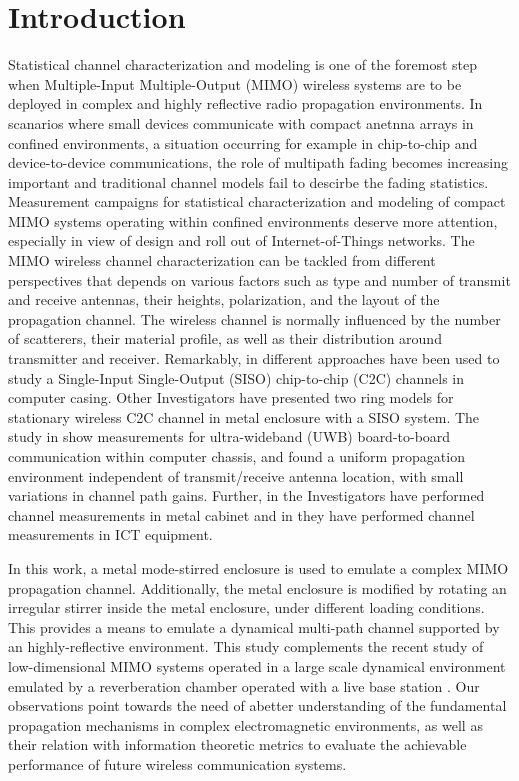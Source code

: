 \documentclass[10pt, final, journal, letterpaper, oneside, twocolumn]{IEEEtran}
\begin{document}
\section{Introduction}\label{sec:introduction}
Statistical channel characterization and modeling is one of the foremost step when Multiple-Input Multiple-Output (MIMO) wireless systems are to be deployed in complex and highly reflective radio propagation environments. In scanarios where small devices communicate with compact anetnna arrays in confined environments, a situation occurring for example in chip-to-chip and device-to-device communications, the role of multipath fading becomes increasing important and traditional channel models fail to descirbe the fading statistics. Measurement campaigns for statistical characterization and modeling of compact MIMO systems operating within confined environments deserve more attention, especially in view of design and roll out of Internet-of-Things networks. The MIMO wireless channel characterization can be tackled from different perspectives that depends on various factors such as type and number of transmit and receive antennas, their heights, polarization, and the layout of the propagation channel. The wireless channel is normally influenced by the number of scatterers, their material profile, as well as their distribution around transmitter and receiver. Remarkably, in \cite{chen2007inter} different approaches have been used to study a Single-Input Single-Output (SISO) chip-to-chip (C2C) channels in computer casing. Other Investigators \cite{zajic2018modeling}\cite{fu2019300}\cite{kim2016300} have presented two ring models for stationary wireless C2C channel in metal enclosure with a SISO system. 
The study in \cite{karedal2007characterization}\cite{redfield2011understanding} show measurements for ultra-wideband (UWB) board-to-board communication within computer chassis, and found a uniform propagation environment independent of transmit/receive antenna location, with small variations in channel path gains. Further, in \cite{khademi2015channel} the Investigators have performed channel measurements in metal cabinet and in \cite{ohira2011experimental}\cite{nakamoto2013wireless} they have performed channel measurements in ICT equipment. 

In this work, a metal mode-stirred enclosure is used to emulate a complex MIMO propagation channel. Additionally, the metal enclosure is modified by rotating an irregular stirrer inside the metal enclosure, under different loading conditions. This provides a means to emulate a dynamical multi-path channel supported by an highly-reflective environment. This study complements the recent study of low-dimensional MIMO systems operated in a large scale dynamical environment emulated by a reverberation chamber operated with a live base station \cite{Micheli2021}.
Our observations point towards the need of abetter understanding of the fundamental propagation mechanisms in complex electromagnetic environments, as well as their relation with information theoretic metrics to evaluate the achievable performance of future wireless communication systems. 
\end{document}
